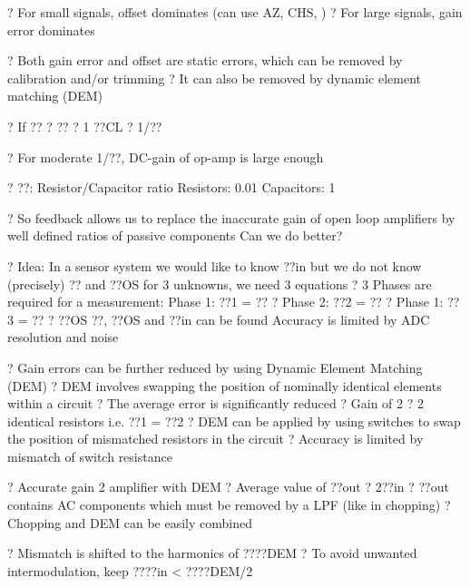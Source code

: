 \documentclass[2pt,landscape]{article}
\begin{document}
\begin{multicols*}{5}
?	For small signals, offset dominates (can use AZ, CHS, \textbullet )
?	For large signals, gain error dominates








?	Both gain error and offset are static errors, which can be removed by 
calibration and/or trimming
?	It can also be removed by dynamic element matching (DEM)



?	If ??	? ?? ? 1	??CL ? 1/??



?	For moderate 1/??, DC-gain of op-amp is large enough

?	??: Resistor/Capacitor ratio
\textbullet 	Resistors: 0.01%
\textbullet 	Capacitors: 1%



?	So feedback allows us to replace the inaccurate gain of open loop 
amplifiers by well defined ratios of passive components	Can we 
do better?




?	Idea: In a sensor system we would like to know ??in but we do not know 
(precisely) ?? and ??OS	for 3 unknowns, we need 3 equations
?	3 Phases are required for a measurement:
\textbullet 	Phase 1: ??1 = ?? ?
\textbullet 	Phase 2: ??2 = ?? ?
\textbullet 	Phase 1: ??3 = ?? ? ??OS
??, ??OS and ??in can be found
Accuracy is limited by ADC resolution and noise



?	Gain errors can be further reduced by using Dynamic Element 
Matching (DEM)
?	DEM involves swapping the position of nominally identical elements 
within a circuit
?	The average error is significantly reduced
?	Gain of 2 ? 2 identical resistors
i.e. ??1 = ??2
?	DEM can be applied by using 
switches to swap the position
of mismatched resistors in the circuit
?	Accuracy is limited by mismatch 
of switch resistance





?	Accurate gain 2 amplifier with DEM
?	Average value of ??out ? 2??in
?	??out contains AC components which must be removed by a LPF 
(like in chopping)
?	Chopping and DEM can be easily combined






?	Mismatch is shifted to the harmonics of ????DEM
?	To avoid unwanted intermodulation, keep ????in  < ????DEM/2




\end{multicols*}
\end{document}
